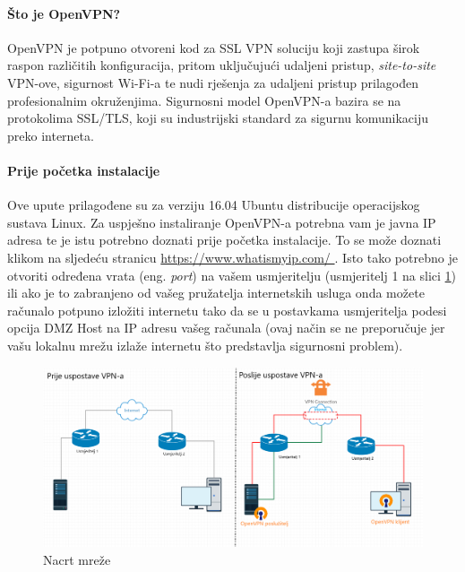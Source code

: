


\bigbreak
\paragraph*{Što je OpenVPN?}
\hfill \smallbreak
OpenVPN\cite{openvpn} je potpuno otvoreni kod za SSL VPN soluciju koji zastupa širok raspon različitih konfiguracija, pritom uključujući udaljeni pristup, \textit{site-to-site} VPN-ove, sigurnost Wi-Fi-a te nudi rješenja za udaljeni pristup prilagođen profesionalnim okruženjima. Sigurnosni model OpenVPN-a bazira se na protokolima SSL/TLS, koji su industrijski standard za sigurnu komunikaciju preko interneta.

\bigbreak
\paragraph*{Prije početka instalacije}
\hfill \smallbreak
 Ove upute\cite{tutorialopenvpn} prilagođene su za verziju 16.04 Ubuntu distribucije operacijskog sustava Linux. Za uspješno instaliranje OpenVPN-a potrebna vam je javna IP adresa te je istu potrebno doznati prije početka instalacije. To se može doznati klikom na sljedeću stranicu \url{https://www.whatismyip.com/ }. Isto tako potrebno je otvoriti određena vrata (eng. \textit{port}) na vašem usmjeritelju (usmjeritelj 1 na slici \ref{fig:nacrt-mreze-finalna}) ili ako je to zabranjeno od vašeg pružatelja internetskih usluga onda možete računalo potpuno izložiti internetu tako da se u postavkama usmjeritelja podesi opcija DMZ Host na IP adresu vašeg računala (ovaj način se ne preporučuje jer vašu lokalnu mrežu izlaže internetu što predstavlja sigurnosni problem).
 \begin{figure}[h]
 	\centering
 	\includegraphics[width=0.7\linewidth]{slike/OpenVPN/nacrt-mreze-finalna}
 	\caption[Nacrt mreže]{Nacrt mreže}
 	\label{fig:nacrt-mreze-finalna}
 \end{figure}
 
